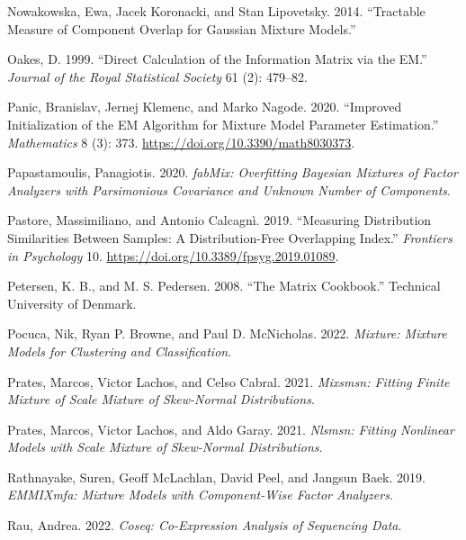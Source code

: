 \begin{CSLReferences}{1}{0}
\leavevmode{}%
Nowakowska, Ewa, Jacek Koronacki, and Stan Lipovetsky. 2014. {``Tractable {Measure} of {Component Overlap} for {Gaussian Mixture Models}.''}

\leavevmode{}%
Oakes, D. 1999. {``Direct Calculation of the Information Matrix via the {EM}.''} \emph{Journal of the Royal Statistical Society} 61 (2): 479--82.

\leavevmode{}%
Panic, Branislav, Jernej Klemenc, and Marko Nagode. 2020. {``Improved Initialization of the EM Algorithm for Mixture Model Parameter Estimation.''} \emph{Mathematics} 8 (3): 373. \url{https://doi.org/10.3390/math8030373}.

\leavevmode{}%
Papastamoulis, Panagiotis. 2020. \emph{fabMix: Overfitting Bayesian Mixtures of Factor Analyzers with Parsimonious Covariance and Unknown Number of Components}.

\leavevmode{}%
Pastore, Massimiliano, and Antonio Calcagnì. 2019. {``Measuring {Distribution Similarities Between Samples}: {A Distribution-Free Overlapping Index}.''} \emph{Frontiers in Psychology} 10. \url{https://doi.org/10.3389/fpsyg.2019.01089}.

\leavevmode{}%
Petersen, K. B., and M. S. Pedersen. 2008. {``The Matrix Cookbook.''} Technical University of Denmark.

\leavevmode{}%
Pocuca, Nik, Ryan P. Browne, and Paul D. McNicholas. 2022. \emph{Mixture: Mixture Models for Clustering and Classification}.

\leavevmode{}%
Prates, Marcos, Victor Lachos, and Celso Cabral. 2021. \emph{Mixsmsn: Fitting Finite Mixture of Scale Mixture of Skew-Normal Distributions}.

\leavevmode{}%
Prates, Marcos, Victor Lachos, and Aldo Garay. 2021. \emph{Nlsmsn: Fitting Nonlinear Models with Scale Mixture of Skew-Normal Distributions}.

\leavevmode{}%
Rathnayake, Suren, Geoff McLachlan, David Peel, and Jangsun Baek. 2019. \emph{EMMIXmfa: Mixture Models with Component-Wise Factor Analyzers}.

\leavevmode{}%
Rau, Andrea. 2022. \emph{Coseq: Co-Expression Analysis of Sequencing Data}.


\end{CSLReferences}
